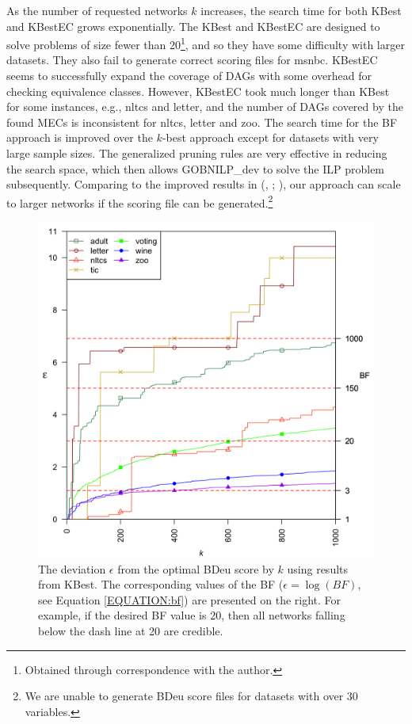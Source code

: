 \documentclass[letterpaper]{article}
\begin{document}
As the number of requested networks $k$ increases, the search time for both KBest and KBestEC grows exponentially. The KBest and KBestEC are designed to solve problems of size fewer than 20\footnote{Obtained through correspondence with the author.}, and so they have some difficulty with larger datasets. They also fail to generate correct scoring files for msnbc. KBestEC seems to successfully expand the coverage of DAGs with some overhead for checking equivalence classes. However, KBestEC took much longer than KBest for some instances, e.g., nltcs and letter, and the number of DAGs covered by the found MECs is inconsistent for nltcs, letter and zoo. The search time for the BF approach is improved over the $k$-best approach except for datasets with very large sample sizes. The generalized pruning rules are very effective in reducing the search space, which then allows GOBNILP\_dev to solve the ILP problem subsequently. Comparing to the improved results in (\citeauthor{ChenCD2015}, \citeyear{ChenCD2015}; \citeyear{ChenCD2016}), our approach can scale to larger networks if the scoring file can be generated.\footnote{We are unable to generate BDeu score files for datasets with over 30 variables.}

\begin{figure}[thb]
    \centering
    \includegraphics[width=\linewidth]{plot_diff.png}
    \caption{The deviation $\epsilon$ from the optimal BDeu score by $k$ using results from KBest. The corresponding values of the BF ($\epsilon=\log(BF)$, see Equation \ref{EQUATION:bf}) are presented on the right. For example, if the desired BF value is 20, then all networks falling below the dash line at 20 are credible.}\label{fig:diff}
\end{figure}
\end{document}
